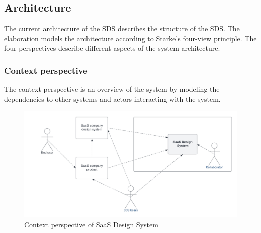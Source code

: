 \subsection{Architecture}
The current architecture of the \ac{SDS} describes the structure of the \ac{SDS}. The elaboration models the architecture according to Starke's four-view principle. The four perspectives describe different aspects of the system architecture. \cite{starke_effektive_2020}

\subsubsection{Context perspective}\label{context_view}
The context perspective is an overview of the system by modeling the dependencies to other systems and actors interacting with the system.\\
\begin{figure}[htbp]
    \centerline{
    \includegraphics[width=\linewidth]{images/context_view_sds.png}}
\caption{Context perspective of \ac{SaaS} Design System}
\label{context_view_sds}
\end{figure}

